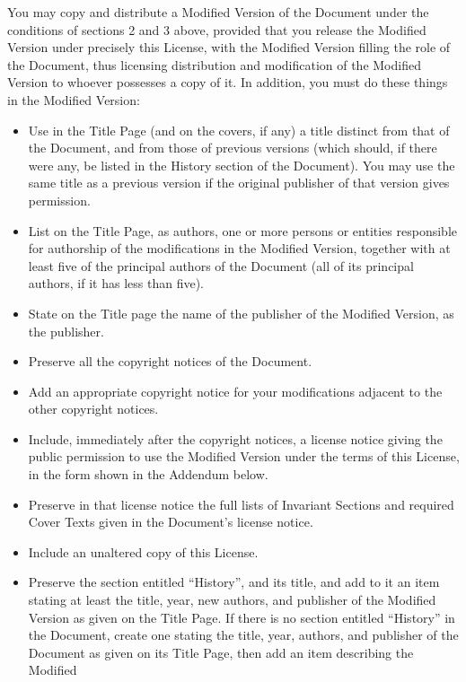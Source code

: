 \documentclass[oneside,a4paper]{book}
\begin{document}
You may copy and distribute a Modified Version of the Document under
the conditions of sections 2 and 3 above, provided that you release
the Modified Version under precisely this License, with the Modified
Version filling the role of the Document, thus licensing distribution
and modification of the Modified Version to whoever possesses a copy
of it.  In addition, you must do these things in the Modified Version:

\begin{itemize}

\item Use in the Title Page (and on the covers, if any) a title distinct
   from that of the Document, and from those of previous versions
   (which should, if there were any, be listed in the History section
   of the Document).  You may use the same title as a previous version
   if the original publisher of that version gives permission.
\item List on the Title Page, as authors, one or more persons or entities
   responsible for authorship of the modifications in the Modified
   Version, together with at least five of the principal authors of the
   Document (all of its principal authors, if it has less than five).
\item State on the Title page the name of the publisher of the
   Modified Version, as the publisher.
\item Preserve all the copyright notices of the Document.
\item Add an appropriate copyright notice for your modifications
   adjacent to the other copyright notices.
\item Include, immediately after the copyright notices, a license notice
   giving the public permission to use the Modified Version under the
   terms of this License, in the form shown in the Addendum below.
\item Preserve in that license notice the full lists of Invariant Sections
   and required Cover Texts given in the Document's license notice.
\item Include an unaltered copy of this License.
\item Preserve the section entitled ``History'', and its title, and add to
   it an item stating at least the title, year, new authors, and
   publisher of the Modified Version as given on the Title Page.  If
   there is no section entitled ``History'' in the Document, create one
   stating the title, year, authors, and publisher of the Document as
   given on its Title Page, then add an item describing the Modified

\end{itemize}
\end{document}

